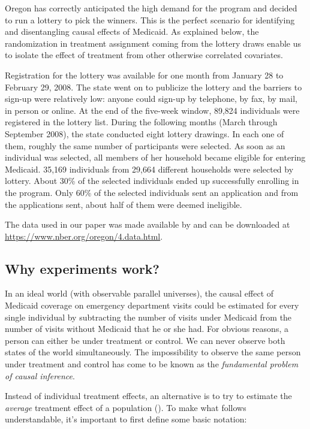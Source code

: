 Oregon has correctly anticipated the high demand for the program and decided to run a lottery to pick the winners. This is the perfect scenario for identifying and disentangling causal effects of Medicaid. As explained below, the randomization in treatment assignment coming from the lottery draws enable us to isolate the effect of treatment from other otherwise correlated covariates.

Registration for the lottery was available for one month from January 28 to February 29, 2008. The state went on to publicize the lottery and the barriers to sign-up were relatively low: anyone could sign-up by telephone, by fax, by mail, in person or online. At the end of the five-week window, 89,824 individuals were registered in the lottery list. During the following months (March through September 2008), the state conducted eight lottery drawings. In each one of them, roughly the same number of participants were selected. As soon as an individual was selected, all members of her household became eligible for entering Medicaid. 35,169 individuals from 29,664 different households were selected by lottery. About 30\% of the selected individuals ended up successfully enrolling in the program. Only 60\% of the selected individuals sent an application and from the applications sent, about half of them were deemed ineligible.

The data used in our paper was made available by \cite{finkelsteinOregonHealthInsurance2012} and can be downloaded at \url{https://www.nber.org/oregon/4.data.html}.

\subsection{Why experiments work?}

In an ideal world (with observable parallel universes), the causal effect of Medicaid coverage on emergency department visits could be estimated for every single individual by subtracting the number of visits under Medicaid from the number of visits without Medicaid that he or she had. For obvious reasons, a person can either be under treatment or control. We can never observe both states of the world simultaneously. The impossibility to observe the same person under treatment and control has come to be known as the \textit{fundamental problem of causal inference}.

Instead of individual treatment effects, an alternative is to try to estimate the \textit{average} treatment effect of a population (\cite{morganCounterfactualsCausalInference2015}). To make what follows understandable, it's important to first define some basic notation:

